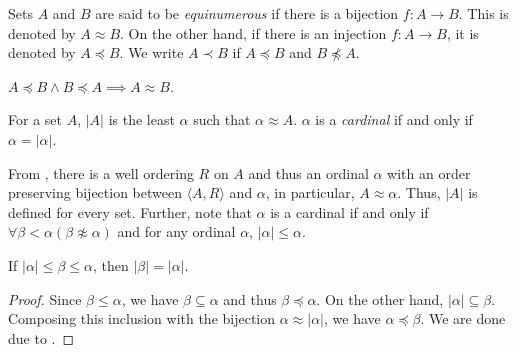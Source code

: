 \begin{definition}
    Sets $A$ and $B$ are said to be \emph{equinumerous} if there is a bijection $f: A\to B$. This is denoted by $A\approx B$. On the other hand, if there is an injection $f: A\to B$, it is denoted by $A\preceq B$. We write $A\prec B$ if $A\preceq B$ and $B\not\preceq A$.
\end{definition}

\begin{theorem}
    $A\preceq B\wedge B\preceq A\implies A\approx B$.
\end{theorem}

\begin{definition}
    For a set $A$, $|A|$ is the least $\alpha$ such that $\alpha\approx A$.
    $\alpha$ is a \emph{cardinal} if and only if $\alpha = |\alpha|$.
\end{definition}

From , there is a well ordering $R$ on $A$ and thus an ordinal $\alpha$ with an order preserving bijection between $\langle A,R\rangle$ and $\alpha$, in particular, $A\approx\alpha$. Thus, $|A|$ is defined for every set. Further, note that $\alpha$ is a cardinal if and only if $\forall\beta < \alpha(\beta\not\approx\alpha)$ and for any ordinal $\alpha$, $|\alpha|\le\alpha$.

\begin{lemma}
    If $|\alpha|\le\beta\le\alpha$, then $|\beta| = |\alpha|$.
\end{lemma}
\begin{proof}
    Since $\beta\le\alpha$, we have $\beta\subseteq\alpha$ and thus $\beta\preceq\alpha$. On the other hand, $|\alpha|\subseteq\beta$. Composing this inclusion with the bijection $\alpha\approx|\alpha|$, we have $\alpha\preceq\beta$. We are done due to .
\end{proof}


